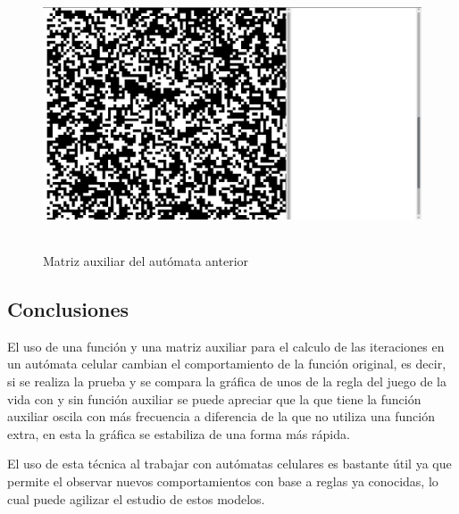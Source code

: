 \documentclass[12pt, titlepage]{article}
\begin{document}
\begin{figure}[H]
\begin{center}
 \includegraphics[width=15cm, height=8cm]{./img/2336-paridad-aux.png}
 \caption{Matriz auxiliar del autómata anterior}
 \label{fig:2336-paridad-aux}
\end{center}
\end{figure}

\subsection{Conclusiones}
El uso de una función y una matriz auxiliar para el calculo de las iteraciones en un autómata celular cambian el comportamiento de la función original, es decir, si se realiza la prueba y se compara la gráfica de unos de la regla del juego de la vida con y sin función auxiliar se puede apreciar que la que tiene la función auxiliar oscila con más frecuencia a diferencia de la que no utiliza una función extra, en esta la gráfica se estabiliza de una forma más rápida.

El uso de esta técnica al trabajar con autómatas celulares es bastante útil ya que permite el observar nuevos comportamientos con base a reglas ya conocidas, lo cual puede agilizar el estudio de estos modelos.



\end{document}
